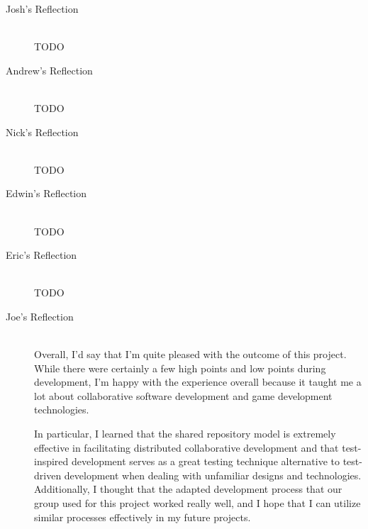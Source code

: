 \documentclass{article}
\begin{document}
		\begin{description}
			\item[Josh's Reflection] \hfill \\
			TODO

			\item[Andrew's Reflection] \hfill \\
			TODO

			\item[Nick's Reflection] \hfill \\
			TODO

			\item[Edwin's Reflection] \hfill \\
			TODO

			\item[Eric's Reflection] \hfill \\
			TODO

			\item[Joe's Reflection] \hfill \\
			Overall, I'd say that I'm quite pleased with the outcome of this
			project.  While there were certainly a few high points and low points
			during development, I'm happy with the experience overall because it
			taught me a lot about collaborative software development and game 
			development technologies.  
			
			In particular, I learned that the shared repository model is extremely 
			effective in facilitating distributed collaborative development and 
			that test-inspired development serves as a great testing technique 
			alternative to test-driven development when dealing with unfamiliar 
			designs and technologies.  Additionally, I thought that the adapted 
			development process that our group used for this project worked really 
			well, and I hope that I can utilize similar processes effectively 
			in my future projects.  		
	\end{description}
\end{document}
